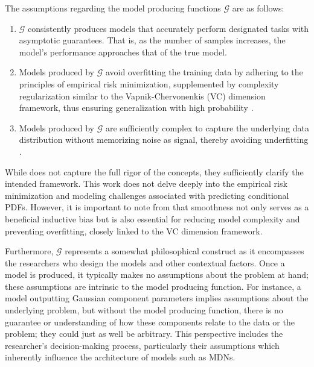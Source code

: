 \begin{definition}\label{def:model_producing}
    The assumptions regarding the model producing functions $\mathcal{G}$ are as follows:
    \begin{enumerate}
        \item $\mathcal{G}$ consistently produces models that accurately perform designated tasks with asymptotic guarantees. That is, as the number of samples increases, the model's performance approaches that of the true model.
        \item Models produced by $\mathcal{G}$ avoid overfitting the training data by adhering to the principles of empirical risk minimization, supplemented by complexity regularization similar to the Vapnik-Chervonenkis (VC) dimension framework, thus ensuring generalization with high probability \cite{vapnik1999overview}.
        \item Models produced by $\mathcal{G}$ are sufficiently complex to capture the underlying data distribution without memorizing noise as signal, thereby avoiding underfitting \cite{vapnik1999overview}.
    \end{enumerate}
\end{definition}

While  does not capture the full rigor of the concepts, they sufficiently clarify the intended framework. This work does not delve deeply into the empirical risk minimization and modeling challenges associated with predicting conditional PDFs. However, it is important to note from  that smoothness not only serves as a beneficial inductive bias but is also essential for reducing model complexity and preventing overfitting, closely linked to the VC dimension framework.

Furthermore, $\mathcal{G}$ represents a somewhat philosophical construct as it encompasses the researchers who design the models and other contextual factors. Once a model is produced, it typically makes no assumptions about the problem at hand; these assumptions are intrinsic to the model producing function. For instance, a model outputting Gaussian component parameters implies assumptions about the underlying problem, but without the model producing function, there is no guarantee or understanding of how these components relate to the data or the problem; they could just as well be arbitrary. This perspective includes the researcher's decision-making process, particularly their assumptions which inherently influence the architecture of models such as MDNs.

